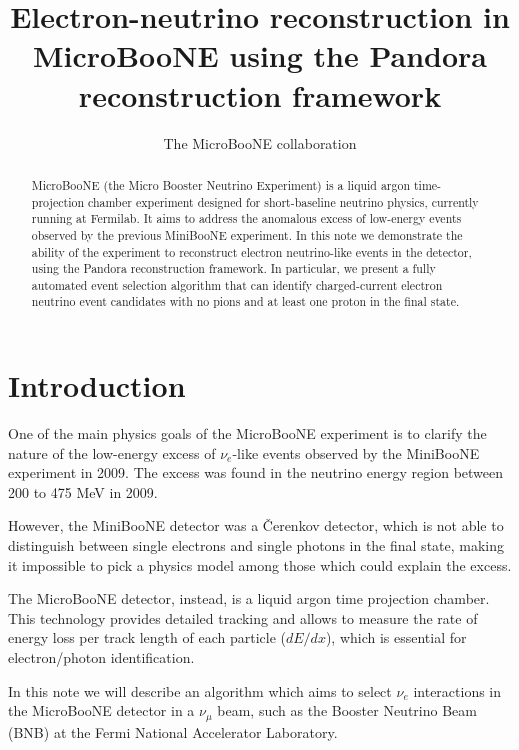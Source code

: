 \documentclass[a4paper]{article}
\title{Electron-neutrino reconstruction in MicroBooNE using the Pandora reconstruction framework}
\author{The MicroBooNE collaboration}
\begin{document}
\maketitle
\tableofcontents

\begin{abstract}
MicroBooNE (the Micro Booster Neutrino Experiment) is a liquid argon
time-projection chamber experiment designed for short-baseline neutrino physics, currently running at Fermilab. It aims to address the anomalous excess of low-energy events observed by the previous MiniBooNE experiment. In this note we demonstrate the ability of the experiment to reconstruct electron neutrino-like events in the detector, using the Pandora reconstruction framework. In particular, we present a fully automated event selection algorithm that can identify charged-current electron neutrino event candidates with no pions and at least one proton in the final state.
\end{abstract}


\section{Introduction}
One of the main physics goals of the MicroBooNE experiment is to clarify the nature of the low-energy excess of $\nu_{e}$-like events observed by the MiniBooNE experiment in 2009. The excess was found in the neutrino energy region between 200 to 475 MeV in 2009.

However, the MiniBooNE detector was a \v{C}erenkov detector, which is not able to distinguish between single electrons and single photons in the final state, making it impossible to pick a physics model among those which could explain the excess.

The MicroBooNE detector, instead, is a liquid argon time projection chamber. This technology provides detailed tracking and allows to measure the rate of energy loss per track length of each particle ($dE/dx$), which is essential for electron/photon identification.

In this note we will describe an algorithm which aims to select $\nu_{e}$ interactions in the MicroBooNE detector in a $\nu_{\mu}$ beam, such as the Booster Neutrino Beam (BNB) at the Fermi National Accelerator Laboratory.
\end{document}
